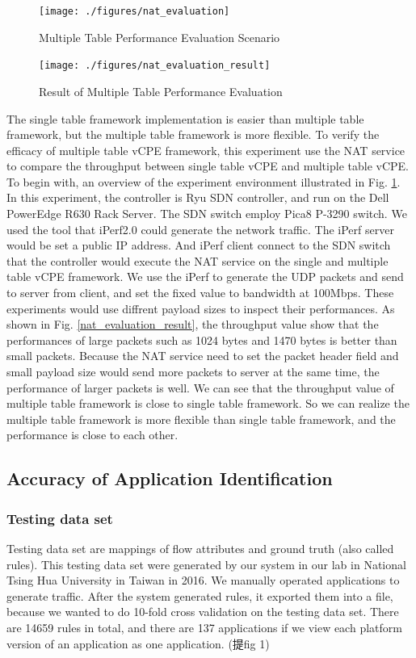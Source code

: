 \documentclass[journal]{IEEEtran}
\begin{document}
\begin{figure}[!t]
\centering
\texttt{[image: ./figures/nat\_evaluation]}
\caption{Multiple Table Performance Evaluation Scenario}
\label{fig:nat_evaluation}
\end{figure}

\begin{figure}[!t]
\centering
\texttt{[image: ./figures/nat\_evaluation\_result]}
\caption{Result of Multiple Table Performance Evaluation}
\label{fig:nat_evaluation_result}
\end{figure}

The single table framework implementation is easier than multiple table framework, but the multiple table framework is more flexible. To verify the efficacy of multiple table vCPE framework, this experiment use the NAT service to compare the throughput between single table vCPE and multiple table vCPE.
To begin with, an overview of the experiment environment illustrated in Fig. \ref{fig:nat_evaluation}.  In this experiment, the controller is Ryu SDN controller, and run on the Dell PowerEdge R630 Rack Server. The SDN switch employ Pica8 P-3290 switch. We used the tool that iPerf2.0 could generate the network traffic. The iPerf server would be set a public IP address. And iPerf client connect to the SDN switch that the controller would execute the NAT service on the single and multiple table vCPE framework.
We use the iPerf  to generate the UDP packets and send to server from client, and set the fixed value to bandwidth at 100Mbps. These experiments would use diffrent payload sizes to inspect their performances.
As shown in Fig. \ref{nat_evaluation_result}, the throughput value show that the performances of large packets such as 1024 bytes and 1470 bytes is better than small packets. Because the NAT service need to set the packet header field and small payload size would send more packets to server at the same time, the performance of larger packets is well. We can see that the throughput value of multiple table framework is close to single table framework. So we can realize the multiple table framework is more flexible than single table framework, and the performance is close to each other.



\subsection{Accuracy of Application Identification }
\subsubsection{Testing data set}
Testing data set are mappings of flow attributes and ground truth (also called rules). This testing data set were generated by our system in our lab in National Tsing Hua University in Taiwan in 2016. We manually operated applications to generate traffic. After the system generated rules, it exported them into a file, because we wanted to do 10-fold cross validation on the testing data set. There are 14659 rules in total, and there are 137 applications if we view each platform version of an application as one application.
(提fig 1)
\end{document}
